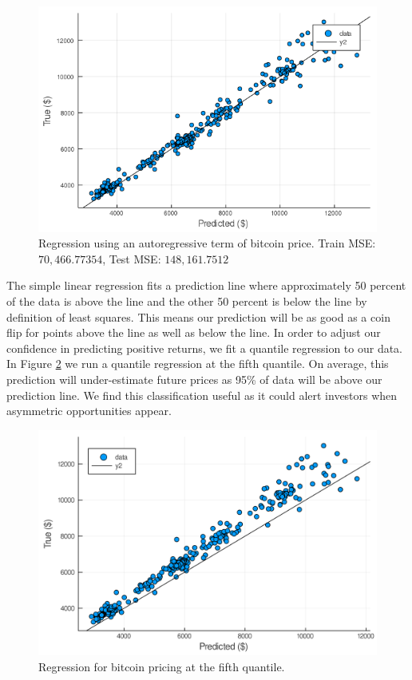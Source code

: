 \documentclass[9pt,twocolumn,twoside]{ilcss}
\begin{document}
\begin{figure}[h]
\centering
\includegraphics[width=.8\linewidth]{Regression_on_price.png}
\caption{Regression using an autoregressive term of bitcoin price. Train MSE: $70,466.77354$, Test MSE: $148,161.7512$}
\label{reg_yes_trans}
\end{figure}

The simple linear regression fits a prediction line where approximately 50 percent of the data is above the line and the other 50 percent is below the line by definition of least squares. This means our prediction will be as good as a coin flip for points above the line as well as below the line.
In order to adjust our confidence in predicting positive returns, we fit a quantile regression to our data. In Figure \ref{quantile_reg_price} we run a quantile regression at the fifth quantile. On average, this prediction will under-estimate future prices as 95\% of data will be above our prediction line. We find this classification useful as it could alert investors when asymmetric opportunities appear. 

\begin{figure}[h]
\centering
\includegraphics[width=.8\linewidth]{quantile_reg_price.png}
\caption{Regression for bitcoin pricing at the fifth quantile.}
\label{quantile_reg_price}
\end{figure}
\end{document}
